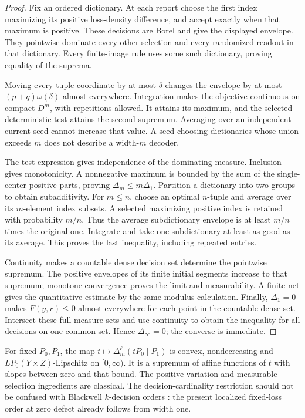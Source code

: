 \begin{proof}
Fix an ordered dictionary. At each report choose the first index maximizing its positive loss-density difference, and accept exactly when that maximum is positive. These decisions are Borel and give the displayed envelope. They pointwise dominate every other selection and every randomized readout in that dictionary. Every finite-image rule uses some such dictionary, proving equality of the suprema.

Moving every tuple coordinate by at most $\delta$ changes the envelope by at most $(p+q)\omega(\delta)$ almost everywhere. Integration makes the objective continuous on compact $D^m$, with repetitions allowed. It attains its maximum, and the selected deterministic test attains the second supremum. Averaging over an independent current seed cannot increase that value. A seed choosing dictionaries whose union exceeds $m$ does not describe a width-$m$ decoder.

The test expression gives independence of the dominating measure. Inclusion gives monotonicity. A nonnegative maximum is bounded by the sum of the single-center positive parts, proving $\Delta_m\le m\Delta_1$. Partition a dictionary into two groups to obtain subadditivity. For $m\le n$, choose an optimal $n$-tuple and average over its $m$-element index subsets. A selected maximizing positive index is retained with probability $m/n$. Thus the average subdictionary envelope is at least $m/n$ times the original one. Integrate and take one subdictionary at least as good as its average. This proves the last inequality, including repeated entries.

Continuity makes a countable dense decision set determine the pointwise supremum. The positive envelopes of its finite initial segments increase to that supremum; monotone convergence proves the limit and measurability. A finite net gives the quantitative estimate by the same modulus calculation. Finally, $\Delta_1=0$ makes $F(y,r)\le0$ almost everywhere for each point in the countable dense set. Intersect these full-measure sets and use continuity to obtain the inequality for all decisions on one common set. Hence $\Delta_\infty=0$; the converse is immediate.
\end{proof}

For fixed $P_0,P_1$, the map $t\mapsto\Delta_m^\ell(tP_0\mid P_1)$ is convex, nondecreasing and $LP_0(Y\times Z)$-Lipschitz on $[0,\infty)$. It is a supremum of affine functions of $t$ with slopes between zero and that bound. The positive-variation and measurable-selection ingredients are classical. The decision-cardinality restriction should not be confused with Blackwell $k$-decision orders \cite{BR14}: the present localized fixed-loss order at zero defect already follows from width one.

